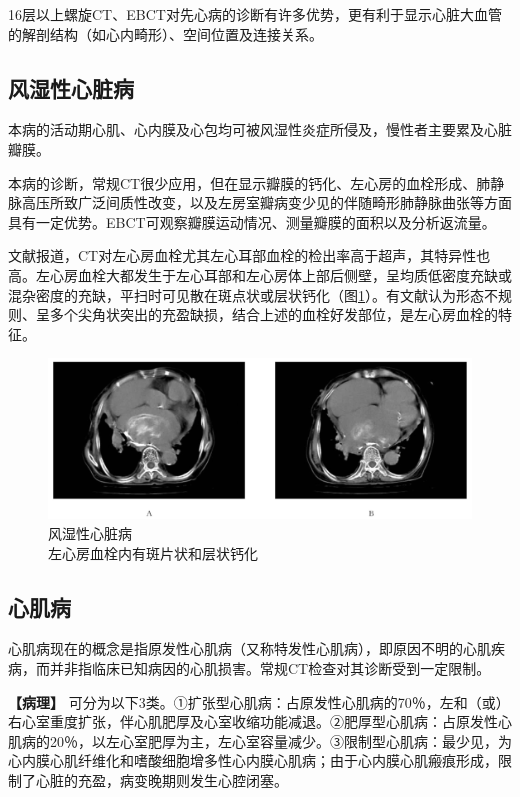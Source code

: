 16层以上螺旋CT、EBCT对先心病的诊断有许多优势，更有利于显示心脏大血管的解剖结构（如心内畸形）、空间位置及连接关系。

\subsection{风湿性心脏病}

本病的活动期心肌、心内膜及心包均可被风湿性炎症所侵及，慢性者主要累及心脏瓣膜。

本病的诊断，常规CT很少应用，但在显示瓣膜的钙化、左心房的血栓形成、肺静脉高压所致广泛间质性改变，以及左房室瓣病变少见的伴随畸形肺静脉曲张等方面具有一定优势。EBCT可观察瓣膜运动情况、测量瓣膜的面积以及分析返流量。

文献报道，CT对左心房血栓尤其左心耳部血栓的检出率高于超声，其特异性也高。左心房血栓大都发生于左心耳部和左心房体上部后侧壁，呈均质低密度充缺或混杂密度的充缺，平扫时可见散在斑点状或层状钙化（图\ref{fig10-6}）。有文献认为形态不规则、呈多个尖角状突出的充盈缺损，结合上述的血栓好发部位，是左心房血栓的特征。

\begin{figure}[!htbp]
 \centering
 \includegraphics[width=.7\textwidth,height=\textheight,keepaspectratio]{./images/Image00265.jpg}
 \captionsetup{justification=centering}
 \caption{风湿性心脏病\\{\small 左心房血栓内有斑片状和层状钙化}}
 \label{fig10-6}
  \end{figure} 

\subsection{心肌病}

心肌病现在的概念是指原发性心肌病（又称特发性心肌病），即原因不明的心肌疾病，而并非指临床已知病因的心肌损害。常规CT检查对其诊断受到一定限制。

\textbf{【病理】}
可分为以下3类。①扩张型心肌病：占原发性心肌病的70％，左和（或）右心室重度扩张，伴心肌肥厚及心室收缩功能减退。②肥厚型心肌病：占原发性心肌病的20％，以左心室肥厚为主，左心室容量减少。③限制型心肌病：最少见，为心内膜心肌纤维化和嗜酸细胞增多性心内膜心肌病；由于心内膜心肌瘢痕形成，限制了心脏的充盈，病变晚期则发生心腔闭塞。

